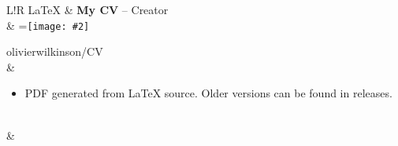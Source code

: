 \documentclass[a4paper,12pt]{article}
\newcommand\VerticalRule{\color{lightgray}\vrule width 0.5pt}
\newcommand{\Icon}[2][0.5cm]{
	\begingroup
	\setbox0=\hbox{\texttt{[image: \#2]}}
	\parbox{\wd0}{\box0}
	\endgroup
}
\begin{document}
\begin{tabular}{L!{\VerticalRule}R}
	LaTeX        & {\bf My CV}  --  Creator                                                           \\
	             & \Icon{github} \hspace{0.1mm} olivierwilkinson/CV                                   \\
	             & \begin{itemize}
		               \item PDF generated from LaTeX source. Older versions can be found in releases.
	               \end{itemize}     \\
	             &                                                                                    \\
\end{tabular}
\end{document}
